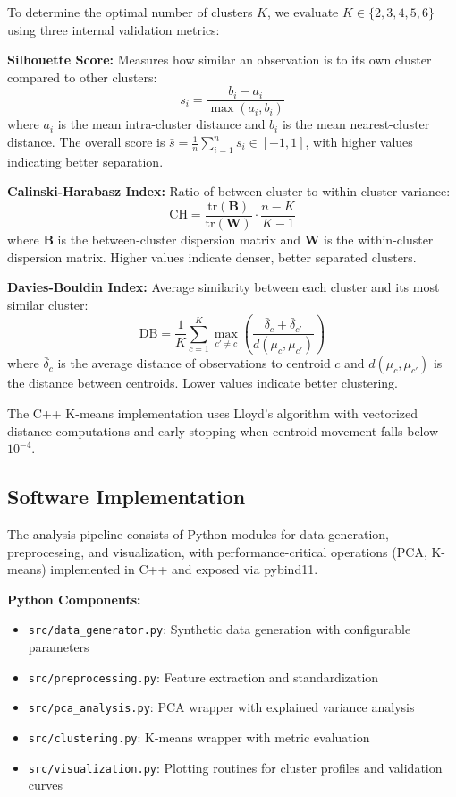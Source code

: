 \documentclass[11pt]{article}
\begin{document}
To determine the optimal number of clusters $K$, we evaluate $K \in \{2, 3, 4, 5, 6\}$ using three internal validation metrics:

\textbf{Silhouette Score:} Measures how similar an observation is to its own cluster compared to other clusters:
\begin{equation}
s_i = \frac{b_i - a_i}{\max(a_i, b_i)}
\end{equation}
where $a_i$ is the mean intra-cluster distance and $b_i$ is the mean nearest-cluster distance. The overall score is $\bar{s} = \frac{1}{n} \sum_{i=1}^{n} s_i \in [-1, 1]$, with higher values indicating better separation.

\textbf{Calinski-Harabasz Index:} Ratio of between-cluster to within-cluster variance:
\begin{equation}
\text{CH} = \frac{\text{tr}(\mathbf{B})}{\text{tr}(\mathbf{W})} \cdot \frac{n - K}{K - 1}
\end{equation}
where $\mathbf{B}$ is the between-cluster dispersion matrix and $\mathbf{W}$ is the within-cluster dispersion matrix. Higher values indicate denser, better separated clusters.

\textbf{Davies-Bouldin Index:} Average similarity between each cluster and its most similar cluster:
\begin{equation}
\text{DB} = \frac{1}{K} \sum_{c=1}^{K} \max_{c' \neq c} \left( \frac{\bar{\delta}_c + \bar{\delta}_{c'}}{d(μ_c, μ_{c'})} \right)
\end{equation}
where $\bar{\delta}_c$ is the average distance of observations to centroid $c$ and $d(\mu_c, \mu_{c'})$ is the distance between centroids. Lower values indicate better clustering.

The C++ K-means implementation uses Lloyd's algorithm with vectorized distance computations and early stopping when centroid movement falls below $10^{-4}$.

\subsection{Software Implementation}

The analysis pipeline consists of Python modules for data generation, preprocessing, and visualization, with performance-critical operations (PCA, K-means) implemented in C++ and exposed via pybind11.

\textbf{Python Components:}
\begin{itemize}
    \item \texttt{src/data\_generator.py}: Synthetic data generation with configurable parameters
    \item \texttt{src/preprocessing.py}: Feature extraction and standardization
    \item \texttt{src/pca\_analysis.py}: PCA wrapper with explained variance analysis
    \item \texttt{src/clustering.py}: K-means wrapper with metric evaluation
    \item \texttt{src/visualization.py}: Plotting routines for cluster profiles and validation curves
\end{itemize}
\end{document}
